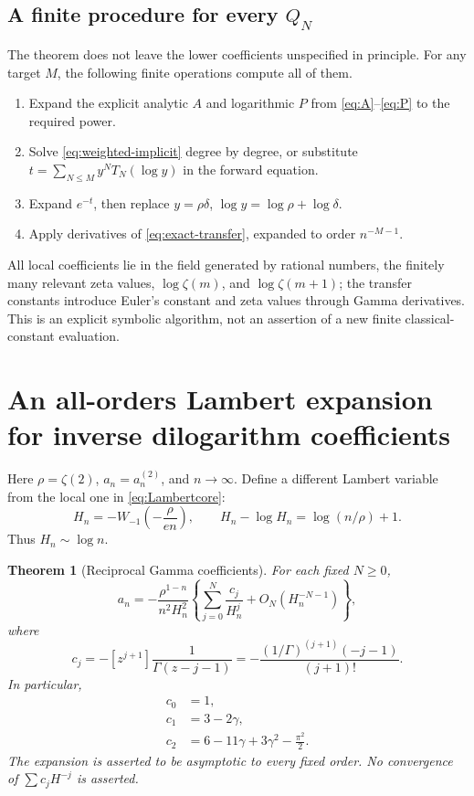 \documentclass[11pt,a4paper]{article}
\numberwithin{equation}{section}
\newtheorem{theorem}{Theorem}[section]
\theoremstyle{definition}
\theoremstyle{remark}
\begin{document}
\subsection{A finite procedure for every \texorpdfstring{\(Q_N\)}{Q(N)}}

The theorem does not leave the lower coefficients unspecified in
principle.  For any target \(M\), the following finite operations compute
all of them.
\begin{enumerate}
\item Expand the explicit analytic \(A\) and logarithmic \(P\) from
\eqref{eq:A}--\eqref{eq:P} to the required power.
\item Solve \eqref{eq:weighted-implicit} degree by degree, or substitute
\(t=\sum_{N\le M}y^NT_N(\log y)\) in the forward equation.
\item Expand \(e^{-t}\), then replace
\(y=\rho\delta\), \(\log y=\log\rho+\log\delta\).
\item Apply derivatives of
\eqref{eq:exact-transfer}, expanded to order \(n^{-M-1}\).
\end{enumerate}
All local coefficients lie in the field generated by rational numbers,
the finitely many relevant zeta values, \(\log\zeta(m)\), and
\(\log\zeta(m+1)\);
the transfer constants introduce Euler's constant and zeta values
through Gamma derivatives.  This is an explicit symbolic algorithm,
not an assertion of a new finite classical-constant evaluation.

\section{An all-orders Lambert expansion for inverse dilogarithm coefficients}
\label{sec:coeff-dilog}

Here \(\rho=\zeta(2)\), \(a_n=a_n^{(2)}\), and \(n\to\infty\).
Define a different Lambert variable from the local one in
\eqref{eq:Lambertcore}:
\begin{equation}
 H_n=-W_{-1}\left(-\frac{\rho}{en}\right),\qquad
 H_n-\log H_n=\log(n/\rho)+1.
 \label{eq:Hn}
\end{equation}
Thus \(H_n\sim\log n\).

\begin{theorem}[Reciprocal Gamma coefficients]
\label{thm:coeff-dilog}
For each fixed \(N\ge0\),
\begin{equation}
 a_n=-\frac{\rho^{1-n}}{n^2H_n^2}
 \left\{\sum_{j=0}^{N}\frac{c_j}{H_n^j}
            +O_N(H_n^{-N-1})\right\},
 \label{eq:dilog-coeff-H}
\end{equation}
where
\begin{equation}
 \boxed{\quad
 c_j=-[z^{j+1}]\frac1{\Gamma(z-j-1)}
 =-\frac{(1/\Gamma)^{(j+1)}(-j-1)}{(j+1)!}.
 \quad}
 \label{eq:cj}
\end{equation}
In particular,
\begin{align}
 c_0&=1,\nonumber\\
 c_1&=3-2\gamma,\nonumber\\
 c_2&=6-11\gamma+3\gamma^2-\frac{\pi^2}{2}.
 \label{eq:c012}
\end{align}
The expansion is asserted to be asymptotic to every fixed order.
No convergence of \(\sum c_jH^{-j}\) is asserted.
\end{theorem}
\end{document}
